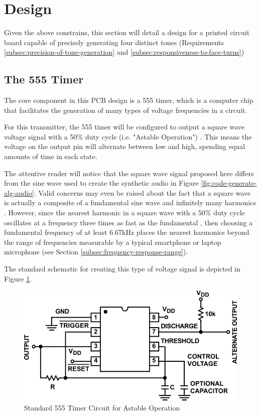 \newpage
\section{Design}
\label{sec:transmitter-design}

Given the above constrains, this section will detail a design for a
printed circuit board capable of precisely generating four distinct
tones (Requirements \ref{subsec:precision-of-tone-generation} and
\ref{subsec:responsiveness-to-face-turns})

\subsection{The 555 Timer}
\label{sec:the-555-timer}

The core component in this PCB design is a 555 timer, which is a
computer chip that facilitates the generation of many types of voltage
frequencies in a circuit.

For this transmitter, the 555 timer will be configured to output a
square wave voltage signal with a 50\% duty cycle (i.e. "Astable
Operation") \cite{icm7555}. This means the voltage on the output pin
will alternate between low and high, spending equal amounts of time in
each state.

The attentive reader will notice that the square wave signal proposed
here differs from the sine wave used to create the synthetic audio in
Figure \ref{fig:code-generate-alg-audio}. Valid concerns may even be
raised about the fact that a square wave is actually a composite of a
fundamental sine wave and infinitely many harmonics \cite{harmonics}.
However, since the nearest harmonic in a square wave with a 50\% duty
cycle oscillates at a frequency three times as fast as the fundamental
\cite{square-waves}, then choosing a fundamental frequency of at least
6.67kHz places the nearest harmonics beyond the range of frequencies
measurable by a typical smartphone or laptop microphone (see Section
\ref{subsec:frequency-response-range}).

The standard schematic for creating this type of voltage signal is
depicted in Figure \ref{fig:555_astable}.

\begin{figure}[h]
    \centering
    \caption{Standard 555 Timer Circuit for Astable Operation \cite{icm7555}}
    \label{fig:555_astable}
    \includegraphics[width=0.75\linewidth]{Figures/6 PCB Design/555_astable.png}
\end{figure}

